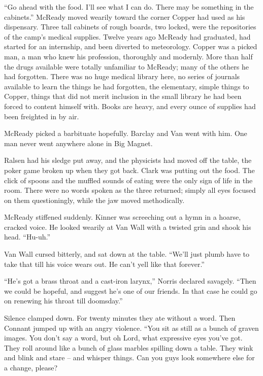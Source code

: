 \documentclass[letterpaper,openany,12pt]{memoir}		%
\begin{document}
``Go ahead with the food. I'll see what I can do. There may be something in the
cabinets.'' McReady moved wearily toward the corner Copper had used as his
dispensary. Three tall cabinets of rough boards, two locked, were the
repositories of the camp's medical supplies. Twelve years ago McReady had
graduated, had started for an internship, and been diverted to meteorology.
Copper was a picked man, a man who knew his profession, thoroughly and modernly.
More than half the drugs available were totally unfamiliar to McReady; many of
the others he had forgotten. There was no huge medical library here, no series
of journals available to learn the things he had forgotten, the elementary,
simple things to Copper, things that did not merit inclusion in the small
library he had been forced to content himself with. Books are heavy, and every
ounce of supplies had been freighted in by air.

McReady picked a barbituate hopefully. Barclay and Van went with him. One man
never went anywhere alone in Big Magnet.

Ralsen had his sledge put away, and the physicists had moved off the table, the
poker game broken up when they got back. Clark was putting out the food. The
click of spoons and the muffled sounds of eating were the only sign of life in
the room. There were no words spoken as the three returned; simply all eyes
focused on them questioningly, while the jaw moved methodically.

McReady stiffened suddenly. Kinner was screeching out a hymn in a hoarse,
cracked voice. He looked wearily at Van Wall with a twisted grin and shook his
head. ``Hu-uh.''

Van Wall cursed bitterly, and sat down at the table. ``We'll just plumb have to
take that till his voice wears out. He can't yell like that forever.''

``He's got a brass throat and a cast-iron larynx,'' Norris declared savagely.
``Then we could be hopeful, and suggest he's one of our friends. In that case he
could go on renewing his throat till doomsday.''

Silence clamped down. For twenty minutes they ate without a word. Then Connant
jumped up with an angry violence. ``You sit as still as a bunch of graven
images. You don't say a word, but oh Lord, what expressive eyes you've got. They
roll around like a bunch of glass marbles spilling down a table. They wink and
blink and stare -- and whisper things. Can you guys look somewhere else for a
change, please?
\end{document}
